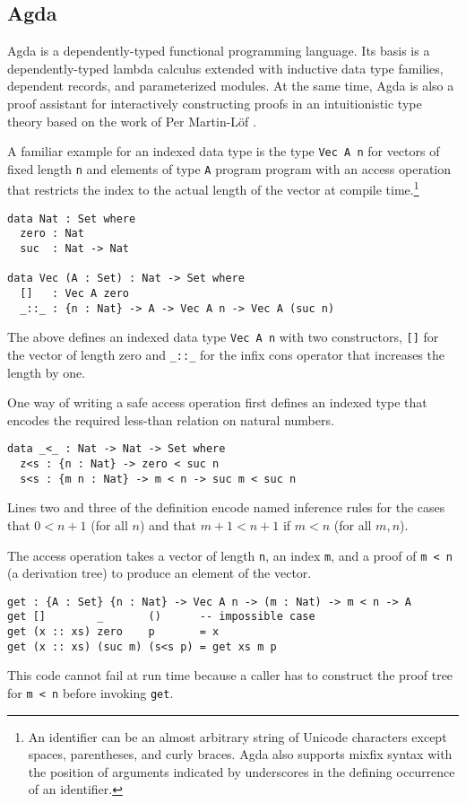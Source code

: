 \documentclass{llncs}
\begin{document}
\subsection{Agda}
\label{sec:agda}

Agda \cite{Norell2008,BoveDybjerNorell2009} is a dependently-typed
functional programming language. Its basis is a dependently-typed
lambda calculus extended with inductive data type families, dependent
records, and parameterized modules. At the same time, Agda is also a
proof assistant for interactively constructing proofs in an
intuitionistic type theory based on the work of Per Martin-L\"of
\cite{MartinLoef1984}. 

A familiar example for an indexed data type is the type
\verb+Vec A n+ for vectors of fixed length \verb+n+ and elements of
type \verb+A+ program program with an access operation that restricts the index to the
actual length of the vector at compile time.\footnote{An
  identifier can be an almost arbitrary 
  string of Unicode characters except spaces, parentheses, and curly
  braces. Agda also supports mixfix syntax with the position of
  arguments indicated by underscores in the defining occurrence of an
  identifier.} 
\begin{verbatim}
data Nat : Set where
  zero : Nat
  suc  : Nat -> Nat

data Vec (A : Set) : Nat -> Set where
  []   : Vec A zero
  _::_ : {n : Nat} -> A -> Vec A n -> Vec A (suc n)
\end{verbatim}
The above defines an indexed data type \verb+Vec A n+ with two
constructors, \verb+[]+ for the vector of length zero and 
\verb+_::_+ for the infix cons operator that increases the length by one.

One way of writing a safe access operation first defines an indexed
type that encodes the required less-than relation on natural numbers.
\begin{verbatim}
data _<_ : Nat -> Nat -> Set where
  z<s : {n : Nat} -> zero < suc n
  s<s : {m n : Nat} -> m < n -> suc m < suc n
\end{verbatim}
Lines two and three of the definition encode named inference rules for
the cases that $0 < n+1$ (for all $n$) and that $m+1 < n+1$ if $m < n$
(for all $m,n$).

The access operation takes a vector of length \verb+n+, an index
\verb+m+, and a proof of \verb+m < n+ (a derivation tree) to produce
an element of the vector.  
\begin{verbatim}
get : {A : Set} {n : Nat} -> Vec A n -> (m : Nat) -> m < n -> A
get []        _       ()      -- impossible case
get (x :: xs) zero    p       = x
get (x :: xs) (suc m) (s<s p) = get xs m p
\end{verbatim}
This code cannot fail at run time because a caller has to
construct the proof tree for \verb+m < n+ before invoking \verb+get+.
\end{document}

